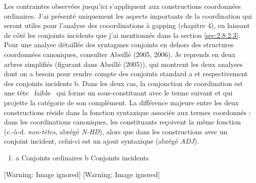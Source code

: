 Les contraintes observées jusqu'ici s'appliquent aux constructions coordonnées ordinaires. J'ai présenté uniquement les aspects importants de la coordination qui seront utiles pour l'analyse des cooordinations à gapping (chapitre 4), en laissant de côté les conjoints incidents que j'ai mentionnés dans la section \ref{sec:2.8.2.3}. Pour une analyse détaillée des syntagmes conjoints en dehors des structures coordonnées canoniques, consulter Abeillé (2005, 2006). Je reprends en  deux arbres simplifiés (figurant dans Abeillé (2005)), qui montrent les deux analyses dont on a besoin pour rendre compte des conjoints standard a et respectivement des conjoints incidents b. Dans les deux cas, la conjonction de coordination est une tête {\guillemotleft}~faible~{\guillemotright} qui forme un sous-constituant avec le terme suivant et qui projette la catégorie de son complément. La différence majeure entre les deux constructions réside dans la fonction syntaxique associée aux termes coordonnés : dans les coordinations canoniques, les constituants reçoivent la même fonction (c.-à-d. \textit{non-têtes}, abrégé \textit{N-HD}), alors que dans les constructions avec un conjoint incident, celui-ci est un ajout syntaxique (abrégé \textit{ADJ}).


\begin{enumerate}
\item \label{bkm:Ref301813041}a  Conjoints ordinaires      b  Conjoints incidents


\end{enumerate}
  [Warning: Image ignored] %
         [Warning: Image ignored] %
 

